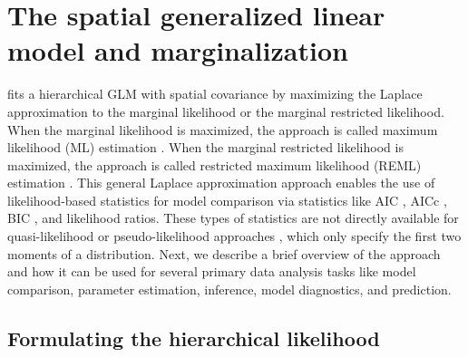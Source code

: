 \documentclass[
]{jss}
\begin{document}
\section{The spatial generalized linear model and
marginalization}\label{sec-spglm}

 fits a hierarchical GLM
\citep{lee1996hierarchical, wood2017generalized} with spatial covariance
by maximizing the Laplace approximation to the marginal likelihood or
the marginal restricted likelihood. When the marginal likelihood is
maximized, the approach is called maximum likelihood (ML) estimation
\citep{bonat2016practical}. When the marginal restricted likelihood is
maximized, the approach is called restricted maximum likelihood (REML)
estimation \citep{ver2024marginal}. This general Laplace approximation
approach enables the use of likelihood-based statistics for model
comparison via statistics like AIC \citep{akaike1974new}, AICc
\citep{hurvich1989regression}, BIC \citep{schwarz1978estimating}, and
likelihood ratios. These types of statistics are not directly available
for quasi-likelihood \citep{wedderburn1974quasi, breslow1993approximate}
or pseudo-likelihood approaches \citep{wolfinger1993generalized}, which
only specify the first two moments of a distribution. Next, we describe
a brief overview of the approach and how it can be used for several
primary data analysis tasks \citep{tredennick2021practical} like model
comparison, parameter estimation, inference, model diagnostics, and
prediction.

\subsection{Formulating the hierarchical
likelihood}\label{formulating-the-hierarchical-likelihood}
\end{document}
